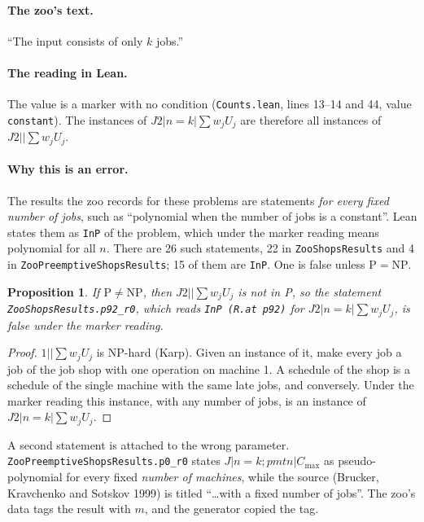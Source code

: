 \documentclass[11pt]{article}
\newcommand{\lean}[1]{\texttt{#1}}
\newcommand{\Cmax}{C_{\max}}
\newtheorem{proposition}{Proposition}
\theoremstyle{definition}
\begin{document}
\paragraph{The zoo's text.} ``The input consists of only $k$ jobs.''

\paragraph{The reading in Lean.} The value is a marker with no condition
(\lean{Counts.lean}, lines 13--14 and 44, value \lean{constant}). The instances
of $J2|n=k|\sum w_jU_j$ are therefore all instances of $J2||\sum w_jU_j$.

\paragraph{Why this is an error.} The results the zoo records for these
problems are statements \emph{for every fixed number of jobs}, such as
``polynomial when the number of jobs is a constant''. Lean states them as
\lean{InP} of the problem, which under the marker reading means polynomial for
all $n$. There are 26 such statements, 22 in \lean{ZooShopsResults} and 4 in
\lean{ZooPreemptiveShopsResults}; 15 of them are \lean{InP}. One is false
unless $\mathrm{P}=\mathrm{NP}$.

\begin{proposition}
If $\mathrm{P}\ne\mathrm{NP}$, then $J2||\sum w_jU_j$ is not in P, so the
statement \lean{ZooShopsResults.p92\_r0}, which reads \lean{InP (R.at p92)} for
$J2|n=k|\sum w_jU_j$, is false under the marker reading.
\end{proposition}

\begin{proof}
$1||\sum w_jU_j$ is NP-hard (Karp). Given an instance of it, make every job a
job of the job shop with one operation on machine 1. A schedule of the shop is
a schedule of the single machine with the same late jobs, and conversely.
Under the marker reading this instance, with any number of jobs, is an
instance of $J2|n=k|\sum w_jU_j$.
\end{proof}

A second statement is attached to the wrong parameter.
\lean{ZooPreemptiveShopsResults.p0\_r0} states $J|n=k;pmtn|\Cmax$ as
pseudo-polynomial for every fixed \emph{number of machines}, while the source
(Brucker, Kravchenko and Sotskov 1999) is titled ``\dots with a fixed number
of jobs''. The zoo's data tags the result with $m$, and the generator copied the
tag.
\end{document}
